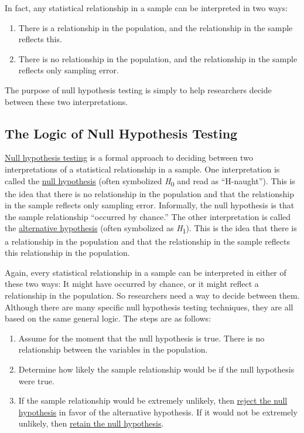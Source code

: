 \documentclass[
]{krantz}
\providecommand{\tightlist}{%
  \setlength{\itemsep}{0pt}\setlength{\parskip}{0pt}}
\begin{document}
In fact, any statistical relationship in a sample can be interpreted in two ways:

\begin{enumerate}
\def\labelenumi{\arabic{enumi}.}
\tightlist
\item
  There is a relationship in the population, and the relationship in the sample reflects this.
\item
  There is no relationship in the population, and the relationship in the sample reflects only sampling error.
\end{enumerate}

The purpose of null hypothesis testing is simply to help researchers decide between these two interpretations.

\subsection*{The Logic of Null Hypothesis Testing}\label{the-logic-of-null-hypothesis-testing}


\hyperref[null-hypothesis-testing]{Null hypothesis testing} is a formal approach to deciding between two interpretations of a statistical relationship in a sample. One interpretation is called the \hyperref[null-hypothesis]{null hypothesis} (often symbolized \emph{H}\textsubscript{0} and read as ``H-naught''). This is the idea that there is no relationship in the population and that the relationship in the sample reflects only sampling error. Informally, the null hypothesis is that the sample relationship ``occurred by chance.'' The other interpretation is called the \hyperref[alternative-hypothesis]{alternative hypothesis} (often symbolized as \emph{H}\textsubscript{1}). This is the idea that there is a relationship in the population and that the relationship in the sample reflects this relationship in the population.

Again, every statistical relationship in a sample can be interpreted in either of these two ways: It might have occurred by chance, or it might reflect a relationship in the population. So researchers need a way to decide between them. Although there are many specific null hypothesis testing techniques, they are all based on the same general logic. The steps are as follows:

\begin{enumerate}
\def\labelenumi{\arabic{enumi}.}
\tightlist
\item
  Assume for the moment that the null hypothesis is true. There is no relationship between the variables in the population.
\item
  Determine how likely the sample relationship would be if the null hypothesis were true.
\item
  If the sample relationship would be extremely unlikely, then \hyperref[reject-the-null-hypothesis]{reject the null hypothesis} in favor of the alternative hypothesis. If it would not be extremely unlikely, then \hyperref[retain-the-null-hypothesis]{retain the null hypothesis}.
\end{enumerate}
\end{document}
